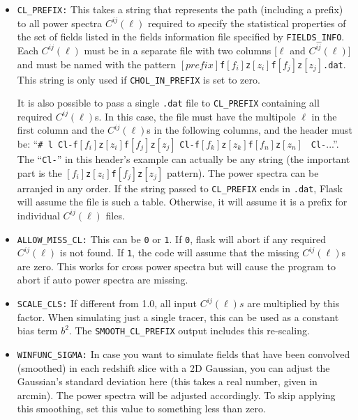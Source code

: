 \documentclass[12pt]{book} %
\begin{document}
\begin{itemize}
\item {\tt CL\_PREFIX:} This takes a string that represents the path (including a prefix) to all 
  power spectra $C^{ij}(\ell)$ required to specify the statistical properties of the set of fields 
  listed in the fields information file specified by {\tt FIELDS\_INFO}. Each $C^{ij}(\ell)$ must 
  be in a separate file with two columns [$\ell$ and $C^{ij}(\ell)$] and must be named with the 
  pattern $[prefix]${\tt f}$[f_i]${\tt z}$[z_i]${\tt f}$[f_j]${\tt z}$[z_j]${\tt .dat}. This string is only used 
  if {\tt CHOL\_IN\_PREFIX} is set to zero.

  It is also possible to pass a single {\tt .dat} file to {\tt CL\_PREFIX} containing all required 
  $C^{ij}(\ell)$s. In this case, the file must have the multipole $\ell$ in the first column and 
  the $C^{ij}(\ell)$s in the following columns, and the header must be: 
  ``{\tt \# l Cl-f}$[f_i]${\tt z}$[z_i]${\tt f}$[f_j]${\tt z}$[z_j]$ 
  {\tt Cl-f}$[f_k]${\tt z}$[z_k]${\tt f}$[f_n]${\tt z}$[z_n]$ {\tt  ~Cl-}...''. The ``{\tt Cl-}'' 
  in this header's example can actually be any string (the important part is the 
  $[f_i]${\tt z}$[z_i]${\tt f}$[f_j]${\tt z}$[z_j]$ pattern). The power spectra can be 
  arranjed in any order. If the string passed to {\tt CL\_PREFIX} ends in {\tt .dat}, {\sc Flask} 
  will assume the file is such a table. Otherwise, it will assume it is a prefix for individual 
  $C^{ij}(\ell)$ files.

\item {\tt ALLOW\_MISS\_CL:} This can be {\tt 0} or {\tt 1}. If {\tt 0}, {\sc flask} will abort 
  if any required $C^{ij}(\ell)$ is not found. If {\tt 1}, the code will assume that the missing 
  $C^{ij}(\ell)$s are zero. This works for cross power spectra but will cause the program to abort 
  if auto power spectra are missing.

\item {\tt SCALE\_CLS:} If different from 1.0, all input $C^{ij}(\ell)s$ are multiplied by 
  this factor. When simulating just a single tracer, this can be used as a constant bias term 
  $b^2$. The {\tt SMOOTH\_CL\_PREFIX} output includes this re-scaling.

\item {\tt WINFUNC\_SIGMA:} In case you want to simulate fields that have been convolved 
  (smoothed) in each redshift slice with a 2D Gaussian, you can adjust the Gaussian's standard 
  deviation here (this takes a real number, given in arcmin). The power spectra will be adjusted accordingly. 
  To skip applying this smoothing, set this value to something less than zero.


\end{itemize}
\end{document}
